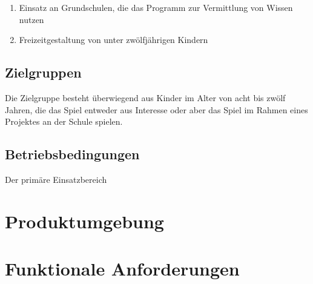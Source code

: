 \documentclass{scrartcl}
\begin{document}
\begin{enumerate}
	\item Einsatz an Grundschulen, die das Programm zur Vermittlung von Wissen nutzen
	\item Freizeitgestaltung von unter zwölfjährigen Kindern
\end{enumerate}

\subsection{Zielgruppen}

Die Zielgruppe besteht überwiegend aus Kinder im Alter von acht bis zwölf Jahren, die das Spiel entweder aus Interesse oder aber das Spiel im Rahmen eines Projektes an der Schule spielen.

\subsection{Betriebsbedingungen}

Der primäre Einsatzbereich 

\clearpage

\section{Produktumgebung}

\clearpage

\section{Funktionale Anforderungen}
\end{document}
